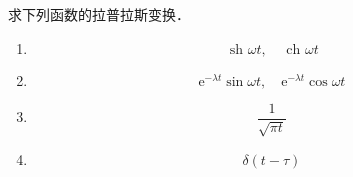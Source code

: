 \begin{exercise}{}
求下列函数的拉普拉斯变换．

\begin{enumerate}
\item \begin{equation}
\text { sh } \omega t, \quad \text { ch } \omega t
\end{equation}
\item \begin{equation}
\mathrm{e}^{-\lambda t} \sin \omega t, \quad \mathrm{e}^{-\lambda t} \cos \omega t
\end{equation}
\item \begin{equation}
\frac{1}{\sqrt{\pi t}}
\end{equation}
\item \begin{equation}
\delta(t-\tau)
\end{equation}
\end{enumerate}
\end{exercise}